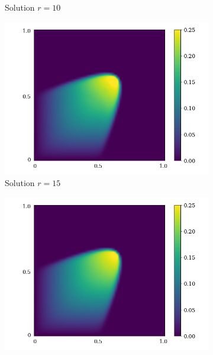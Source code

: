 \begin{figure}[!htb]
\begin{center}
\begin{subfigure}[b]{0.23\textwidth}
\begin{center}
            \end{center}
             \caption{Solution $r = 10$}
         \end{subfigure}
    \begin{subfigure}[b]{0.23\textwidth}
            \begin{center}
                \includegraphics[trim = {0, 0, 3cm, 0}, clip, width=\textwidth]{Pictures/X-rom-LE-CNNAE-15.png}
            \end{center}
             \caption{Solution $r = 15$}
         \end{subfigure}
    \begin{subfigure}[b]{0.23\textwidth}
            \begin{center}
                \includegraphics[trim = {0, 0, 3cm, 0}, clip, width=\textwidth]{Pictures/X-rom-LE-CNNAE-20.png}

\end{center}
\end{subfigure}
\end{center}
\end{figure}
